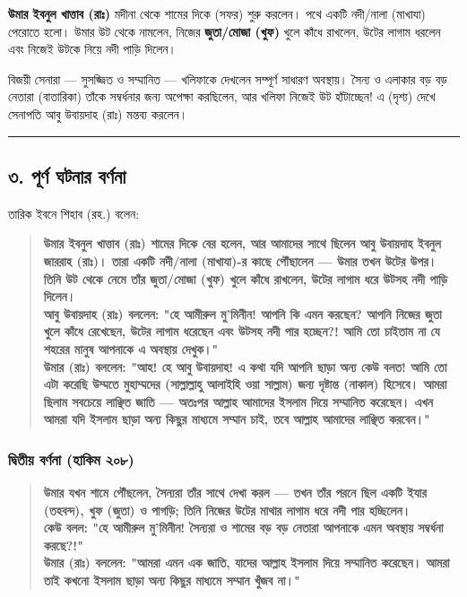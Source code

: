 \textbf{উমার ইবনুল খাত্তাব (রাঃ)} মদীনা থেকে শামের দিকে  (সফর) শুরু করলেন। পথে একটি নদী/নালা (মাখাযা) পেরোতে হলো। উমার উট থেকে নামলেন, নিজের \textbf{জুতা/মোজা (খুফ)} খুলে কাঁধে রাখলেন, উটের লাগাম ধরলেন এবং নিজেই উটকে নিয়ে নদী পাড়ি দিলেন।

বিজয়ী সেনারা — সুসজ্জিত ও সম্মানিত — খলিফাকে দেখলেন সম্পূর্ণ সাধারণ অবস্থায়। সৈন্য ও এলাকার বড় বড় নেতারা (বাতারিকা) তাঁকে সম্বর্ধনার জন্য অপেক্ষা করছিলেন, আর খলিফা নিজেই উট হাঁটাচ্ছেন! এ  (দৃশ্য) দেখে সেনাপতি আবু উবায়দাহ (রাঃ) মন্তব্য করলেন।

\medskip\hrule\medskip

\subsection*{৩. পূর্ণ ঘটনার বর্ণনা}

তারিক ইবনে শিহাব (রহ.) বলেন:

\begin{quote}
\textbf{উমার ইবনুল খাত্তাব (রাঃ) শামের দিকে বের হলেন, আর আমাদের সাথে ছিলেন আবু উবায়দাহ ইবনুল জাররাহ (রাঃ)। তারা একটি নদী/নালা (মাখাযা)-র কাছে পৌঁছালেন — উমার তখন উটের উপর।} \\
\textbf{তিনি উট থেকে নেমে তাঁর জুতা/মোজা (খুফ) খুলে কাঁধে রাখলেন, উটের লাগাম ধরে উটসহ নদী পাড়ি দিলেন।} \\
\textbf{আবু উবায়দাহ (রাঃ) বললেন: "হে আমীরুল মু'মিনীন! আপনি কি এমন করছেন? আপনি নিজের জুতা খুলে কাঁধে রেখেছেন, উটের লাগাম ধরেছেন এবং উটসহ নদী পার হচ্ছেন?! আমি তো চাইতাম না যে শহরের মানুষ আপনাকে এ অবস্থায় দেখুক।"} \\
\textbf{উমার (রাঃ) বললেন: "আহ! হে আবু উবায়দাহ! এ কথা যদি আপনি ছাড়া অন্য কেউ বলত! আমি তো এটা করেছি উম্মতে মুহাম্মদের (সাল্লাল্লাহু আলাইহি ওয়া সাল্লাম) জন্য দৃষ্টান্ত (নাকাল) হিসেবে। আমরা ছিলাম সবচেয়ে লাঞ্ছিত জাতি — অতঃপর আল্লাহ আমাদের ইসলাম দিয়ে সম্মানিত করেছেন। এখন আমরা যদি ইসলাম ছাড়া অন্য কিছুর মাধ্যমে সম্মান চাই, তবে আল্লাহ আমাদের লাঞ্ছিত করবেন।"}
\end{quote}

\subsubsection*{দ্বিতীয় বর্ণনা (হাকিম ২০৮)}

\begin{quote}
\textbf{উমার যখন শামে পৌঁছলেন, সৈন্যরা তাঁর সাথে দেখা করল — তখন তাঁর পরনে ছিল একটি ইযার (তহবন্দ), খুফ (জুতা) ও পাগড়ি; তিনি নিজের উটের মাথার লাগাম ধরে নদী পার হচ্ছিলেন।} \\
\textbf{কেউ বলল: "হে আমীরুল মু'মিনীন! সৈন্যরা ও শামের বড় বড় নেতারা আপনাকে এমন অবস্থায় সম্বর্ধনা করছে?!"} \\
\textbf{উমার (রাঃ) বললেন: "আমরা এমন এক জাতি, যাদের আল্লাহ ইসলাম দিয়ে সম্মানিত করেছেন। আমরা তাই কখনো ইসলাম ছাড়া অন্য কিছুর মাধ্যমে সম্মান খুঁজব না।"}
\end{quote}

